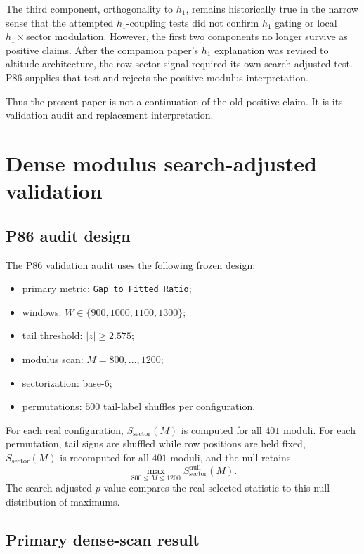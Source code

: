 \documentclass[11pt]{article}
\begin{document}
The third component, orthogonality to \(h_1\), remains historically true in the narrow sense that the attempted \(h_1\)-coupling tests did not confirm \(h_1\) gating or local \(h_1\times\)sector modulation. However, the first two components no longer survive as positive claims. After the companion paper's \(h_1\) explanation was revised to altitude architecture, the row-sector signal required its own search-adjusted test. P86 supplies that test and rejects the positive modulus interpretation.

Thus the present paper is not a continuation of the old positive claim. It is its validation audit and replacement interpretation.

\section{Dense modulus search-adjusted validation}

\subsection{P86 audit design}

The P86 validation audit uses the following frozen design:
\begin{itemize}
    \item primary metric: \texttt{Gap\_to\_Fitted\_Ratio};
    \item windows: \(W\in\{900,1000,1100,1300\}\);
    \item tail threshold: \(|z|\ge 2.575\);
    \item modulus scan: \(M=800,\ldots,1200\);
    \item sectorization: base-6;
    \item permutations: \(500\) tail-label shuffles per configuration.
\end{itemize}

For each real configuration, \(S_{\mathrm{sector}}(M)\) is computed for all \(401\) moduli. For each permutation, tail signs are shuffled while row positions are held fixed, \(S_{\mathrm{sector}}(M)\) is recomputed for all \(401\) moduli, and the null retains
\[
\max_{800\le M\le 1200} S_{\mathrm{sector}}^{\mathrm{null}}(M).
\]
The search-adjusted \(p\)-value compares the real selected statistic to this null distribution of maximums.

\subsection{Primary dense-scan result}
\end{document}
